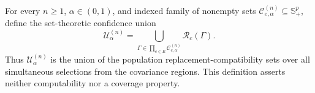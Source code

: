 For every \(n\geq1\), \(\alpha\in(0,1)\), and indexed family of nonempty sets \(\mathcal C^{(n)}_{e,\alpha}\subseteq\mathbb S_{+}^{p}\), define the set-theoretic confidence union
\[
\mathcal U^{(n)}_{\alpha}
=\bigcup_{\Gamma\in\prod_{e\in E}\mathcal C^{(n)}_{e,\alpha}}
\mathcal R_c(\Gamma).
\]
Thus \(\mathcal U^{(n)}_{\alpha}\) is the union of the population replacement-compatibility sets over all simultaneous selections from the covariance regions. This definition asserts neither computability nor a coverage property.